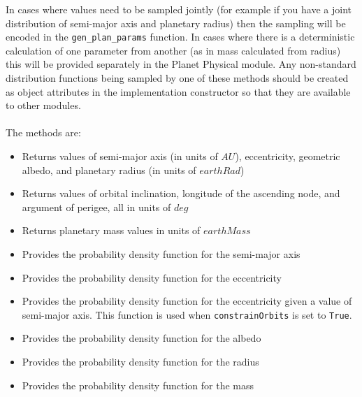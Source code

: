 \documentclass[cleanfoot]{asme2ej}
\begin{document}
In cases where values need to be sampled jointly (for example if you have a joint distribution of semi-major axis and planetary radius) then the sampling will be encoded in the \verb+gen_plan_params+ function.  In cases where there is a deterministic calculation of one parameter from another (as in mass calculated from radius) this will be provided separately in the Planet Physical module. Any non-standard distribution functions being sampled by one of these methods should be created as object attributes in the implementation constructor so that they are available to other modules.
\\\\
The methods are:
\begin{itemize}[leftmargin=1.5in,font={\ttfamily}]
    \item[\texttt gen\_plan\_params] Returns values of semi-major axis (in units of $ AU $), eccentricity, geometric albedo, and planetary radius (in units of $ earthRad $)
    \item[\texttt gen\_angles] Returns values of orbital inclination, longitude of the ascending node, and argument of perigee, all in units of $ deg $
    \item[\texttt gen\_mass] Returns planetary mass values in units of $earthMass$
    \item[\texttt dist\_sma] Provides the probability density function for the semi-major axis
    \item[\texttt dist\_eccen] Provides the probability density function for the eccentricity
    \item[\texttt dist\_eccen\_from\_sma] Provides the probability density function for the eccentricity given a value of semi-major axis. This function is used when \verb+constrainOrbits+ is set to \verb+True+.
    \item[\texttt dist\_albedo] Provides the probability density function for the albedo
    \item[\texttt dist\_radius] Provides the probability density function for the radius
    \item[\texttt dist\_mass] Provides the probability density function for the mass
\end{itemize}


\end{document}
